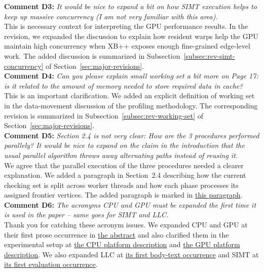 \noindent\textbf{Comment D3:} \textit{It would be nice to expand a bit on how SIMT execution helps to keep up massive concurrency (I am not very familiar with this area).}
\\

\noindent This is necessary context for interpreting the GPU performance results. In the revision, we expanded the discussion to explain how resident warps help the GPU maintain high concurrency when XB++ exposes enough fine-grained edge-level work. The added discussion is summarized in Subsection~\ref{subsec:rev-simt-concurrency} of Section~\ref{sec:major-revisions}.
\\

\noindent\textbf{Comment D4:} \textit{Can you please explain small working set a bit more on Page 17: is it related to the amount of memory needed to store required data in cache?}
\\

\noindent This is an important clarification. We added an explicit definition of working set in the data-movement discussion of the profiling methodology. The corresponding revision is summarized in Subsection~\ref{subsec:rev-working-set} of Section~\ref{sec:major-revisions}.
\\

\noindent\textbf{Comment D5:} \textit{Section 2.4 is not very clear: How are the 3 procedures performed parallely? It would be nice to expand on the claim in the introduction that the usual parallel algorithm throws away alternating paths instead of reusing it.}
\\

\noindent We agree that the parallel execution of the three procedures needed a clearer explanation. We added a paragraph in Section~2.4 describing how the current checking set is split across worker threads and how each phase processes its assigned frontier vertices. The added paragraph is marked in \hyperref[para:xblossom-three-parallel-procedures]{this paragraph}.
\\

\noindent\textbf{Comment D6:} \textit{The acronyms CPU and GPU must be expanded the first time it is used in the paper -- same goes for SIMT and LLC.}
\\

\noindent Thank you for catching these acronym issues. We expanded CPU and GPU at their first prose occurrence in \hyperref[para:first-cpu-gpu]{the abstract} and also clarified them in the experimental setup at \hyperref[para:exp-setup-cpu]{the CPU platform description} and \hyperref[para:exp-setup-gpu]{the GPU platform description}. We also expanded LLC at \hyperref[para:first-llc]{its first body-text occurrence} and SIMT at \hyperref[para:first-simt]{its first evaluation occurrence}.
\\

